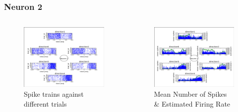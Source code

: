 \documentclass{beamer}
\begin{document}
\begin{frame}\frametitle{Neuron 2}
\begin{columns}
 \begin{column}{5cm}
  \begin{figure}
   \includegraphics[scale=0.25]{fig/neuron2spikes.png}
   \caption{Spike trains against different trials}
  \end{figure}
 \end{column}
 \begin{column}{5cm}
  \begin{figure}
   \includegraphics[scale=0.25]{fig/neuron2rates}
   \caption{Mean Number of Spikes \& Estimated Firing Rate}
  \end{figure}
 \end{column}
\end{columns}
\end{frame}
\end{document}
